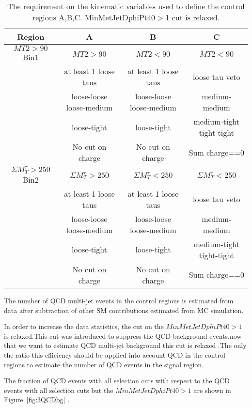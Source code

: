 \begin{table}
\begin{center}
\begin{tabular}{|c|c|c|c|}
\hline
Region&A& B & C
\\ \hline\hline
$MT2>90$ Bin1 &$MT2 >90$ & $MT2 <90$&$MT2 <90$ \\
 &at least 1 loose taus&at least 1 loose taus& loose tau veto\\
 &loose-loose loose-medium &loose-loose loose-medium &medium-medium \\
 &loose-tight&loose-tight&medium-tight tight-tight\\ 
 &No cut on charge&No cut on charge& Sum charge==0\\
\hline
$\Sigma M_{T}^{\tau}>250$ Bin2 &$\Sigma M_{T}^{\tau} >250$ &$\Sigma M_{T}^{\tau} <250$&$\Sigma M_{T}^{\tau} < 250$\\
 &at least 1 loose taus&at least 1 loose taus& loose tau veto\\
 &loose-loose loose-medium &loose-loose loose-medium &medium-medium \\
 &loose-tight&loose-tight&medium-tight tight-tight\\
 &No cut on charge&No cut on charge& Sum charge==0\\

\hline
\end{tabular}
\caption{The requirement on the kinematic variables used to define the control regions A,B,C.
MinMetJetDphiPt40$>$1 cut is relaxed. }
\label{2QCDbg}
\end{center}
\end{table}

The number of QCD multi-jet events in the control regions is estimated from data after subtraction of other SM contributions estimated from MC simulation.

In order to increase the data statistics, the cut on the $MinMetJetDphiPt40>1$ is relaxed.This cut was
introduced to suppress the QCD background events,now that we want to estimate QCD multi-jet background this cut is relaxed  .The only the ratio this efficiency should be
applied into account QCD in the control regions to estimate the number of QCD events in the signal region.

The fraction of QCD events with all selection cuts with respect to the QCD events with all selection cuts but the
$MinMetJetDphiPt40>1$ are shown in Figure~\ref{fig:3QCDbg} .


